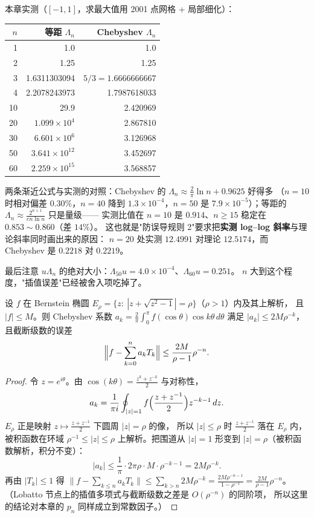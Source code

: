 \begin{remark}[量级：为什么等距节点不能拖大]
本章实测（$[{-1},1]$，求最大值用 2001 点网格 + 局部细化）：

\begin{center}
\begin{tabular}{r|r|r}
  $n$ & 等距 $\Lambda_n$ & Chebyshev $\Lambda_n$ \\ \hline
  1 & 1.0 & 1.0 \\
  2 & 1.25 & 1.25 \\
  3 & 1.6311303094 & $5/3=1.6666666667$ \\
  4 & 2.2078243973 & 1.7987618033 \\
  10 & 29.9 & 2.420969 \\
  20 & $1.099\times10^{4}$ & 2.867810 \\
  30 & $6.601\times10^{6}$ & 3.126968 \\
  50 & $3.641\times10^{12}$ & 3.452697 \\
  60 & $2.259\times10^{15}$ & 3.568857 \\
\end{tabular}
\end{center}

两条渐近公式与实测的对照：Chebyshev 的 $\Lambda_n\approx\frac2\pi\ln n+0.9625$ 好得多
（$n=10$ 时相对偏差 $0.30\%$，$n=40$ 降到 $1.3\times10^{-4}$，$n=50$ 是 $7.9\times10^{-5}$）；等距的 $\Lambda_n\approx\frac{2^{n+1}}{en\ln n}$ 只是量级——
实测比值在 $n=10$ 是 $0.914$、$n\ge15$ 稳定在 $0.853\sim0.860$（差 $14\%$）。
这也就是"防误导规则 2"要求把\textbf{实测 log--log 斜率}与理论斜率同时画出来的原因：
$n=20$ 处实测 $12.4991$ 对理论 $12.5174$，而 Chebyshev 是 $0.2218$ 对 $0.2219$。

最后注意 $u\Lambda_n$ 的绝对大小：$\Lambda_{50}u=4.0\times10^{-4}$、$\Lambda_{60}u=0.251$。
$n$ 大到这个程度，"插值误差"已经被舍入项吃掉了。
\end{remark}

\begin{theorem}
\label{thm:ellipse}
设 $f$ 在 Bernstein 椭圆 $E_\rho=\{z:\ |z+\sqrt{z^2-1}|=\rho\}$（$\rho>1$）内及其上解析，
且 $|f|\le M$。则 Chebyshev 系数 $a_k=\frac2\pi\int_0^\pi f(\cos\theta)\cos k\theta\,d\theta$
满足 $|a_k|\le2M\rho^{-k}$，且截断级数的误差
\[
  \Bigl\|f-\sum_{k=0}^{n}a_kT_k\Bigr\|\le\frac{2M}{\rho-1}\rho^{-n}.
\]
\end{theorem}

\begin{proof}
令 $z=e^{i\theta}$。由 $\cos(k\theta)=\frac{z^k+z^{-k}}2$ 与对称性，
\[
  a_k=\frac1{\pi i}\oint_{|z|=1}f\Bigl(\frac{z+z^{-1}}2\Bigr)z^{-k-1}\,dz .
\]
$E_\rho$ 正是映射 $z\mapsto\frac{z+z^{-1}}2$ 下圆周 $|z|=\rho$ 的像，
所以 $|z|\le\rho$ 时 $\frac{z+z^{-1}}2$ 落在 $E_\rho$ 内，被积函数在环域
$\rho^{-1}\le|z|\le\rho$ 上解析。把围道从 $|z|=1$ 形变到 $|z|=\rho$（被积函数解析，积分不变）：
\[
  |a_k|\le\frac1\pi\cdot2\pi\rho\cdot M\cdot\rho^{-k-1}=2M\rho^{-k}.
\]
再由 $|T_k|\le1$ 得
$\bigl\|f-\sum_{k\le n}a_kT_k\bigr\|\le\sum_{k>n}2M\rho^{-k}
=\frac{2M\rho^{-n-1}}{1-\rho^{-1}}=\frac{2M}{\rho-1}\rho^{-n}$。
（Lobatto 节点上的插值多项式与截断级数之差是 $O(\rho^{-n})$ 的同阶项，
所以这里的结论对本章的 $p_n$ 同样成立到常数因子。）
\end{proof}

